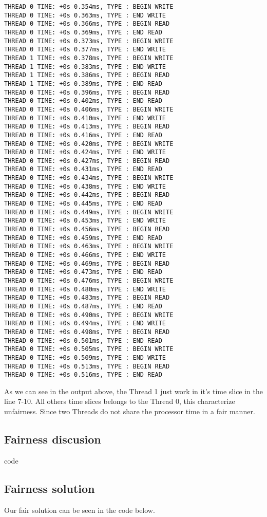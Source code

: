\documentclass{article}
\begin{document}
\begin{lstlisting}
THREAD 0 TIME: +0s 0.354ms, TYPE : BEGIN WRITE 
THREAD 0 TIME: +0s 0.363ms, TYPE : END WRITE 
THREAD 0 TIME: +0s 0.366ms, TYPE : BEGIN READ 
THREAD 0 TIME: +0s 0.369ms, TYPE : END READ 
THREAD 0 TIME: +0s 0.373ms, TYPE : BEGIN WRITE 
THREAD 0 TIME: +0s 0.377ms, TYPE : END WRITE 
THREAD 1 TIME: +0s 0.378ms, TYPE : BEGIN WRITE 
THREAD 1 TIME: +0s 0.383ms, TYPE : END WRITE 
THREAD 1 TIME: +0s 0.386ms, TYPE : BEGIN READ 
THREAD 1 TIME: +0s 0.389ms, TYPE : END READ 
THREAD 0 TIME: +0s 0.396ms, TYPE : BEGIN READ 
THREAD 0 TIME: +0s 0.402ms, TYPE : END READ 
THREAD 0 TIME: +0s 0.406ms, TYPE : BEGIN WRITE 
THREAD 0 TIME: +0s 0.410ms, TYPE : END WRITE 
THREAD 0 TIME: +0s 0.413ms, TYPE : BEGIN READ 
THREAD 0 TIME: +0s 0.416ms, TYPE : END READ 
THREAD 0 TIME: +0s 0.420ms, TYPE : BEGIN WRITE 
THREAD 0 TIME: +0s 0.424ms, TYPE : END WRITE 
THREAD 0 TIME: +0s 0.427ms, TYPE : BEGIN READ 
THREAD 0 TIME: +0s 0.431ms, TYPE : END READ 
THREAD 0 TIME: +0s 0.434ms, TYPE : BEGIN WRITE 
THREAD 0 TIME: +0s 0.438ms, TYPE : END WRITE 
THREAD 0 TIME: +0s 0.442ms, TYPE : BEGIN READ 
THREAD 0 TIME: +0s 0.445ms, TYPE : END READ 
THREAD 0 TIME: +0s 0.449ms, TYPE : BEGIN WRITE 
THREAD 0 TIME: +0s 0.453ms, TYPE : END WRITE 
THREAD 0 TIME: +0s 0.456ms, TYPE : BEGIN READ 
THREAD 0 TIME: +0s 0.459ms, TYPE : END READ 
THREAD 0 TIME: +0s 0.463ms, TYPE : BEGIN WRITE 
THREAD 0 TIME: +0s 0.466ms, TYPE : END WRITE 
THREAD 0 TIME: +0s 0.469ms, TYPE : BEGIN READ 
THREAD 0 TIME: +0s 0.473ms, TYPE : END READ 
THREAD 0 TIME: +0s 0.476ms, TYPE : BEGIN WRITE 
THREAD 0 TIME: +0s 0.480ms, TYPE : END WRITE 
THREAD 0 TIME: +0s 0.483ms, TYPE : BEGIN READ 
THREAD 0 TIME: +0s 0.487ms, TYPE : END READ 
THREAD 0 TIME: +0s 0.490ms, TYPE : BEGIN WRITE 
THREAD 0 TIME: +0s 0.494ms, TYPE : END WRITE 
THREAD 0 TIME: +0s 0.498ms, TYPE : BEGIN READ 
THREAD 0 TIME: +0s 0.501ms, TYPE : END READ 
THREAD 0 TIME: +0s 0.505ms, TYPE : BEGIN WRITE 
THREAD 0 TIME: +0s 0.509ms, TYPE : END WRITE 
THREAD 0 TIME: +0s 0.513ms, TYPE : BEGIN READ 
THREAD 0 TIME: +0s 0.516ms, TYPE : END READ
\end{lstlisting}

As we can see in the output above, the Thread 1 just work in it's time slice in the line 7-10. All
others time slices belongs to the Thread 0, this characterize unfairness. Since two Threads do not
share the processor time in a fair manner.

\subsection{Fairness discusion}

code

\subsection{Fairness solution}

Our fair solution can be seen in the code below.
\end{document}
